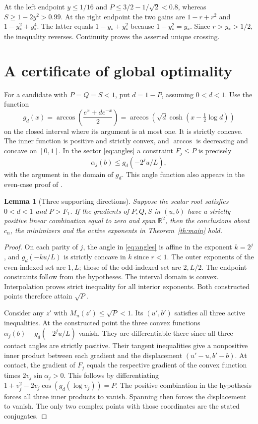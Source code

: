 \documentclass[11pt,letterpaper]{article}
\newtheorem{lemma}[theorem]{Lemma}
\newcommand{\R}{\mathbb R}
\begin{document}
At the left endpoint \(y\le1/16\) and \(P\le3/2-1/\sqrt2<0.8\),
whereas \(S\ge1-2y^2>0.99\). At the right endpoint the two gains are
\(1-r+r^2\) and \(1-y_*^2+y_*^4\). The latter equals
\(1-y_*+y_*^2\) because \(1-y_*^2=y_*\). Since \(r>y_*>1/2\),
the inequality reverses. Continuity proves the asserted unique crossing.

\newpage
\section{A certificate of global optimality}
For a candidate with \(P=Q=S<1\), put \(d=1-P\), assuming \(0<d<1\).
Use the function
\[
 g_d(x)=\arccos\!\left(\frac{e^x+d e^{-x}}2\right)
 =\arccos\!\left(\sqrt d\cosh(x-\tfrac12\log d)\right)
\]
on the closed interval where its argument is at most one. It is strictly
concave. The inner function is positive and strictly convex, and
\(\arccos\) is decreasing and concave on \([0,1]\). In the sector
\eqref{eq:angles} a constraint \(F_j\le P\) is precisely
\begin{equation}\label{eq:convex}
  \alpha_j(b)\le g_d(-2^j u/L),
\end{equation}
with the argument in the domain of \(g_d\). This angle function also
appears in the even-case proof of \cite{packet}.

\begin{lemma}[Three supporting directions]\label{lem:certificate}
Suppose the scalar root satisfies \(0<d<1\) and \(P>F_1\).
If the gradients of \(P,Q,S\) in \((u,b)\) have a strictly positive
linear combination equal to zero and span \(\R^2\), then the conclusions
about \(c_n\), the minimizers and the active exponents in
Theorem~\ref{th:main} hold.
\end{lemma}

\begin{proof}
On each parity of \(j\), the angle in \eqref{eq:angles} is affine in
the exponent \(k=2^j\), and \(g_d(-ku/L)\) is strictly concave in \(k\)
since \(r<1\). The outer exponents of the even-indexed set are \(1,L\);
those of the odd-indexed set are \(2,L/2\). The endpoint constraints follow
from the hypotheses. The interval domain is convex. Interpolation proves
strict inequality for all interior exponents. Both constructed points
therefore attain \(\sqrt P\).

Consider any \(z'\) with \(M_n(z')\le\sqrt P<1\). Its \((u',b')\)
satisfies all three active inequalities. At the constructed point the
three convex functions \(\alpha_j(b)-g_d(-2^ju/L)\) vanish. They are
differentiable there since all three contact angles are strictly positive.
Their tangent inequalities give a nonpositive inner product between
each gradient and the displacement \((u'-u,b'-b)\). At contact, the gradient
of \(F_j\) equals the respective gradient of the convex function times
\(2v_j\sin\alpha_j>0\). This follows by differentiating
\(1+v_j^2-2v_j\cos(g_d(\log v_j))=P\).
The positive combination in the hypothesis forces all three inner
products to vanish. Spanning then forces the displacement to vanish.
The only two complex points with those coordinates are the stated conjugates.
\end{proof}
\end{document}
